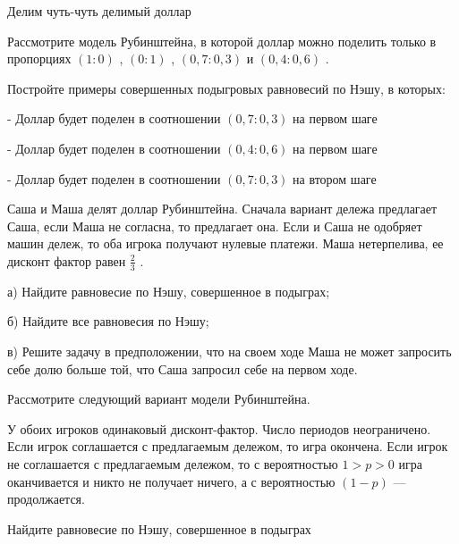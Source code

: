 \begin{problem}
 Делим чуть-чуть делимый доллар\par
Рассмотрите модель Рубинштейна, в которой доллар можно поделить только в пропорциях  $\left(1:0\right)$ ,  $\left(0:1\right)$ ,  $\left(0,7:0,3\right)$  и  $\left(0,4:0,6\right)$ .\par
Постройте примеры совершенных подыгровых равновесий по Нэшу, в которых:\par
- Доллар будет поделен в соотношении  $\left(0,7:0,3\right)$  на первом шаге\par
- Доллар будет поделен в соотношении  $\left(0,4:0,6\right)$  на первом шаге\par
- Доллар будет поделен в соотношении  $\left(0,7:0,3\right)$  на втором шаге\par



\begin{sol}

\end{sol}
\end{problem}



\begin{problem}
 [LSE, 1998]\par
Саша и Маша делят доллар Рубинштейна. Сначала вариант дележа предлагает Саша, если Маша не согласна, то предлагает она. Если и Саша не одобряет машин дележ, то оба игрока получают нулевые платежи. Маша нетерпелива, ее дисконт фактор равен  $\frac{2}{3} $ .\par
а) Найдите равновесие по Нэшу, совершенное в подыграх;\par
б) Найдите все равновесия по Нэшу;\par
в) Решите задачу в предположении, что на своем ходе Маша не может запросить себе долю больше той, что Саша запросил себе на первом ходе.



\begin{sol}

\end{sol}
\end{problem}



\begin{problem}
 Рассмотрите следующий вариант модели Рубинштейна. \par %
У обоих игроков одинаковый дисконт-фактор. Число периодов
неограничено. Если игрок соглашается с предлагаемым дележом, то
игра окончена. Если игрок не соглашается с предлагаемым дележом,
то с вероятностью $1>p>0$ игра оканчивается и никто не получает
ничего, а с вероятностью $(1-p)$ — продолжается. \par
Найдите равновесие по Нэшу, совершенное в подыграх



\begin{sol}

\end{sol}
\end{problem}



